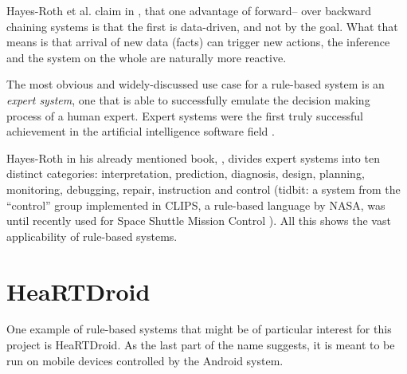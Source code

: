 Hayes-Roth et al. claim in \cite{hayes1984building}, that one advantage of forward-- over backward chaining systems is that the first is data-driven, and not by the goal. What that means is that arrival of new data (facts) can trigger new actions, the inference and the system on the whole are naturally more reactive.

The most obvious and widely-discussed use case for a rule-based system is an \emph{expert system}, one that is able to successfully emulate the decision making process of a human expert. Expert systems were the first truly successful achievement in the artificial intelligence software field \cite{russell1995artificial}.

Hayes-Roth in his already mentioned book, \cite{hayes1984building}, divides expert systems into ten distinct categories: interpretation, prediction, diagnosis, design, planning, monitoring, debugging, repair, instruction and control (tidbit: a system from the ``control'' group implemented in CLIPS, a rule-based language by NASA, was until recently used for Space Shuttle Mission Control \cite{rasmussen1990inco}). All this shows the vast applicability of rule-based systems.

\section{HeaRTDroid}

One example of rule-based systems that might be of particular interest for this project is HeaRTDroid. As the last part of the name suggests, it is meant to be run on mobile devices controlled by the Android system.